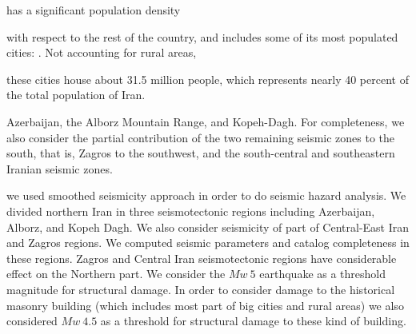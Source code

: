 has a significant population density 


with respect to the rest of the country, and includes some of its most populated cities: . Not accounting for rural areas, 

these cities house about 31.5 million people, which represents nearly 40 percent of the total population of Iran. 








Azerbaijan, the Alborz Mountain Range, and Kopeh-Dagh. For completeness, we also consider the partial contribution of the two remaining seismic zones to the south, that is, Zagros to the southwest, and the south-central and southeastern Iranian seismic zones.


we used smoothed seismicity approach \citep{Frankel1995} in order to do seismic hazard analysis. We divided northern Iran in three seismotectonic regions including Azerbaijan, Alborz, and Kopeh Dagh. We also consider seismicity of part of Central-East Iran and Zagros regions. We computed seismic parameters and catalog completeness in these regions. Zagros and Central Iran seismotectonic regions have considerable effect on the Northern part.  We consider the $Mw \  5$ earthquake as a threshold magnitude  for structural damage. In order to consider damage to the historical masonry building (which includes most part of big cities and rural areas) we also considered $Mw \  4.5$ as a threshold for structural damage to these kind of building. 











